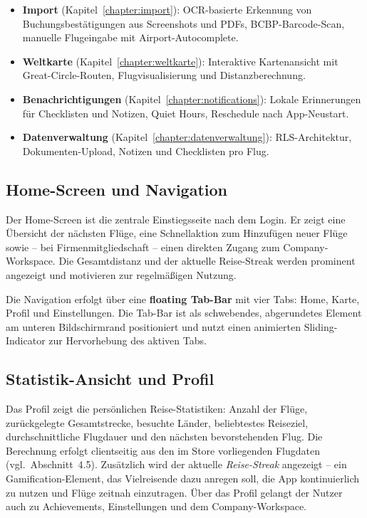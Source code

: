 \begin{itemize}
  \item \textbf{Import} (Kapitel~\ref{chapter:import}): OCR-basierte Erkennung von
    Buchungsbestätigungen aus Screenshots und PDFs, BCBP-Barcode-Scan, manuelle
    Flugeingabe mit Airport-Autocomplete.
  \item \textbf{Weltkarte} (Kapitel~\ref{chapter:weltkarte}): Interaktive Kartenansicht
    mit Great-Circle-Routen, Flugvisualisierung und Distanzberechnung.
  \item \textbf{Benachrichtigungen} (Kapitel~\ref{chapter:notifications}): Lokale
    Erinnerungen für Checklisten und Notizen, Quiet Hours, Reschedule nach App-Neustart.
  \item \textbf{Datenverwaltung} (Kapitel~\ref{chapter:datenverwaltung}): RLS-Architektur,
    Dokumenten-Upload, Notizen und Checklisten pro Flug.
\end{itemize}

\subsection{Home-Screen und Navigation}

Der Home-Screen ist die zentrale Einstiegsseite nach dem Login. Er zeigt eine
Übersicht der nächsten Flüge, eine Schnellaktion zum Hinzufügen neuer Flüge sowie
-- bei Firmenmitgliedschaft -- einen direkten Zugang zum Company-Workspace. Die
Gesamtdistanz und der aktuelle Reise-Streak werden prominent angezeigt und
motivieren zur regelmäßigen Nutzung.

Die Navigation erfolgt über eine \textbf{floating Tab-Bar} mit vier Tabs: Home,
Karte, Profil und Einstellungen. Die Tab-Bar ist als schwebendes, abgerundetes
Element am unteren Bildschirmrand positioniert und nutzt einen animierten
Sliding-Indicator zur Hervorhebung des aktiven Tabs.

\subsection{Statistik-Ansicht und Profil}

Das Profil zeigt die persönlichen Reise-Statistiken:
Anzahl der Flüge, zurückgelegte Gesamtstrecke, besuchte Länder, beliebtestes Reiseziel,
durchschnittliche Flugdauer und den nächsten bevorstehenden Flug. Die Berechnung
erfolgt clientseitig aus den im Store vorliegenden Flugdaten (vgl.\ Abschnitt~4.5).
Zusätzlich wird der aktuelle \emph{Reise-Streak} angezeigt -- ein Gamification-Element,
das Vielreisende dazu anregen soll, die App kontinuierlich zu nutzen und Flüge zeitnah
einzutragen. Über das Profil gelangt der Nutzer auch zu Achievements, Einstellungen
und dem Company-Workspace.


